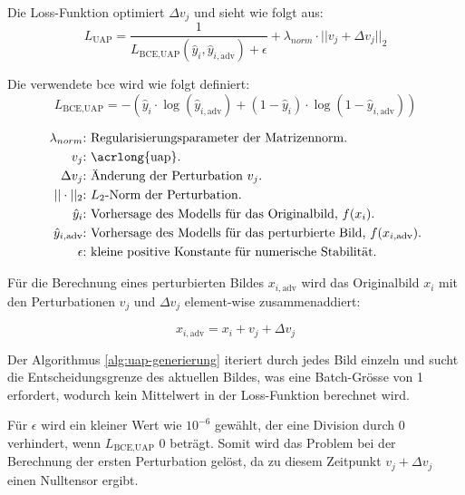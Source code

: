 Die Loss-Funktion optimiert $\Delta v_j$ und sieht wie folgt aus:
\begin{equation}
    L_{\text{UAP}} = \frac{1}{L_{\text{BCE,UAP}}(\hat{y}_i, \hat{y}_{i,\text{adv}}) + \epsilon} + \lambda_{norm} \cdot ||v_j + \Delta v_j||_2 
\label{eq:Loss L_UAP}
\end{equation}

Die verwendete \acrlong{bce} wird wie folgt definiert:
\begin{equation}
L_{\text{BCE,UAP}} = - (\hat{y}_i \cdot \log(\hat{y}_{i,\text{adv}}) + (1-\hat{y}_i) \cdot \log(1-\hat{y}_{i,\text{adv}}))
\label{eq:BCE_UAP}
\end{equation}

\begin{align*}
    \lambda_{norm}\text{:} &\text{ Regularisierungsparameter der Matrizennorm.} \\
    v_j\text{:} &\text{ \acrlong{uap}.} \\
    \Delta v_j\text{:} &\text{ Änderung der Perturbation } v_j \text{.} \\
    ||\cdot||_2\text{:} & \text{ $L_2$-Norm der Perturbation.} \\
    \hat{y}_i\text{:} &\text{ Vorhersage des Modells für das Originalbild, $f(x_{i})$.} \\
    \hat{y}_{i,\text{adv}}\text{:} &\text{ Vorhersage des Modells für das perturbierte Bild, $f(x_{i,\text{adv}})$.} \\
    \epsilon\text{:} &\text{ kleine positive Konstante für numerische Stabilität.}
\end{align*}

Für die Berechnung eines perturbierten Bildes $x_{i,\text{adv}}$ wird das Originalbild $x_i$ mit den Perturbationen $v_j$ und $\Delta v_j$ element-wise zusammenaddiert: 

\begin{equation}
    x_{i,\text{adv}} = x_i + v_j + \Delta v_j
    \label{eq:xadv}
\end{equation}

Der Algorithmus \ref{alg:uap-generierung} iteriert durch jedes Bild einzeln und sucht die Entscheidungsgrenze des aktuellen Bildes, was eine Batch-Grösse von 1 erfordert, wodurch kein Mittelwert in der Loss-Funktion berechnet wird.

Für $\epsilon$ wird ein kleiner Wert wie $10^{-6}$ gewählt, der eine Division durch 0 verhindert, wenn $L_{\text{BCE,UAP}}$ 0 beträgt. Somit wird das Problem bei der Berechnung der ersten Perturbation gelöst, da zu diesem Zeitpunkt $v_j + \Delta v_j$ einen Nulltensor ergibt. 

